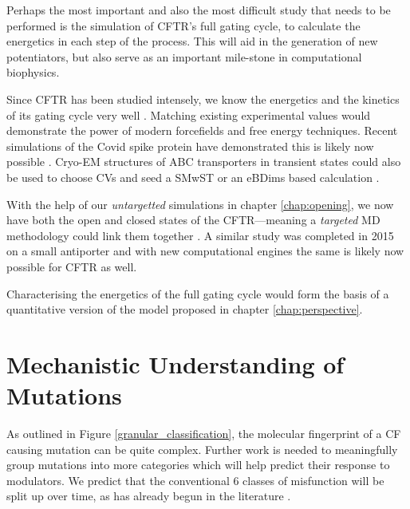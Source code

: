 
Perhaps the most important and also the most difficult study that needs to be performed is the simulation of CFTR's full gating cycle, to calculate the energetics in each step of the process. This will aid in the generation of new potentiators, but also serve as an important mile-stone in computational biophysics.

Since CFTR has been studied intensely, we know the energetics and the kinetics of its gating cycle very well \cite{csanady2017}. Matching existing experimental values would demonstrate the power of modern forcefields and free energy techniques. Recent simulations of the Covid spike protein have demonstrated this is likely now possible \cite{casalino2021}. Cryo-EM structures of ABC transporters in transient states could also be used to choose CVs and seed a SMwST or an eBDims based calculation \cite{hofmann2019, orellana2016, roux2021, pan2008}. 

With the help of our \textit{untargetted} simulations in chapter \ref{chap:opening}, we now have both the open and closed states of the CFTR---meaning a \textit{targeted} MD methodology could link them together \cite{zhang2018, liu2017}. A similar study was completed in 2015 on a small antiporter and with new computational engines the same is likely now possible for CFTR as well\cite{moradi2015}.

Characterising the energetics of the full gating cycle would form the basis of a quantitative version of the model proposed in chapter \ref{chap:perspective}.

\section{Mechanistic Understanding of Mutations}
As outlined in Figure \ref{granular_classification}, the molecular fingerprint of a CF causing mutation can be quite complex. Further work is needed to meaningfully group mutations into more categories which will help predict their response to modulators. We predict that the conventional 6 classes of misfunction will be split up over time, as has already begun in the literature \cite{veit2016}. 

